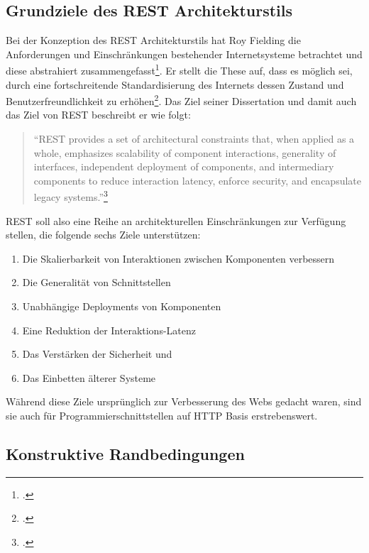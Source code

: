\subsection{Grundziele des REST Architekturstils}\label{subsection:grundziele-des-rest}

Bei der Konzeption des REST Architekturstils hat Roy Fielding die Anforderungen und Einschränkungen bestehender Internetsysteme betrachtet und diese abstrahiert zusammengefasst\footcite[Vgl. ][S. 76]{fielding_architectural_2000}. Er stellt die These auf, dass es möglich sei, durch eine fortschreitende Standardisierung des Internets dessen Zustand und Benutzerfreundlichkeit zu erhöhen\footcite[Vgl. ][S. 73f]{fielding_architectural_2000}. Das Ziel seiner Dissertation und damit auch das Ziel von REST beschreibt er wie folgt:

\begin{quote}
    \enquote{REST provides a set of architectural constraints that, when applied as a whole, emphasizes scalability of component interactions, generality of interfaces, independent deployment of components, and intermediary components to reduce interaction latency, enforce security, and encapsulate legacy systems.}\footcite[Vgl. ][S. 75]{fielding_architectural_2000}
\end{quote}

REST soll also eine Reihe an architekturellen Einschränkungen zur Verfügung stellen, die folgende sechs Ziele unterstützen:

\begin{enumerate}
    \item Die Skalierbarkeit von Interaktionen zwischen Komponenten verbessern
    \item Die Generalität von Schnittstellen
    \item Unabhängige Deployments von Komponenten
    \item Eine Reduktion der Interaktions-Latenz
    \item Das Verstärken der Sicherheit und
    \item Das Einbetten älterer Systeme
\end{enumerate}

Während diese Ziele ursprünglich zur Verbesserung des Webs gedacht waren, sind sie auch für Programmierschnittstellen auf HTTP Basis erstrebenswert.

\subsection{Konstruktive Randbedingungen}\label{subsection:konstruktive-randbedingungen}

